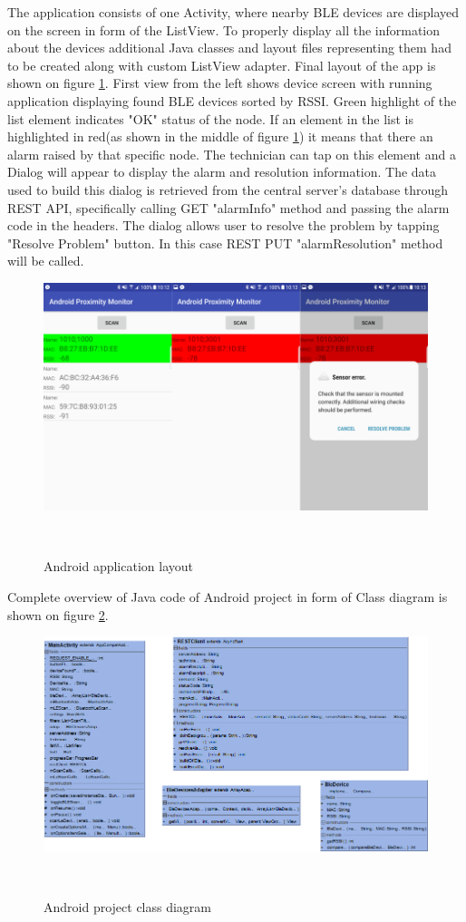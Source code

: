 The application consists of one Activity\cite{Activity}, where nearby BLE devices are displayed on the screen in form of the ListView\cite{ListView}. To properly display all the information about the devices additional Java classes and layout files representing them had to be created along with custom ListView adapter. Final layout of the app is shown on figure \ref{fig:AndroidScreenshots}. First view from the left shows device screen with running application displaying found BLE devices sorted by RSSI. Green highlight of the list element indicates "OK" status of the node. If an element in the list is highlighted in red(as shown in the middle of figure \ref{fig:AndroidScreenshots}) it means that there an alarm raised by that specific node. The technician can tap on this element and a Dialog\cite{Dialog} will appear to display the alarm and resolution information. The data used to build this dialog is retrieved from the central server's database through REST API, specifically calling GET "alarmInfo" method and passing the alarm code in the headers. The dialog allows user to resolve the problem by tapping "Resolve Problem" button. In this case REST PUT "alarmResolution" method will be called.

\begin{figure}[H]
\centering
\includegraphics[scale=0.65]{gfx/AndroidScreenshots}
\caption{Android application layout}~\label{fig:AndroidScreenshots}
\end{figure}

Complete overview of Java code of Android project in form of Class diagram is shown on figure \ref{fig:AndroidClass}. 

\begin{figure}[H]
\centering
\includegraphics[scale=0.45]{gfx/AndroidClassDiagram}
\caption{Android project class diagram}~\label{fig:AndroidClass}
\end{figure}
